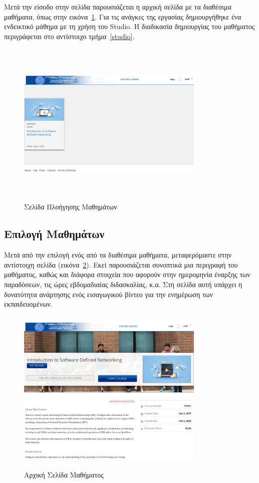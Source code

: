 \documentclass[12pt]{report}
\begin{document}
Μετά την είσοδο στην σελίδα παρουσιάζεται η αρχική σελίδα με τα διαθέσιμα μαθήματα, όπως στην εικόνα~\ref{fig:microsite-explore-course}. Για τις ανάγκες της εργασίας δημιουργήθηκε ένα ενδεικτικό μάθημα με τη χρήση του \textlatin{Studio}. Η διαδικασία δημιουργίας του μαθήματος περιγράφεται στο αντίστοιχο τμήμα~\ref{studio}.
\begin{figure}[h]
\centering
\includegraphics[width=0.8\textwidth, height=8cm]{microsite-explore-courses}
\caption{Σελίδα Πλοήγησης Μαθημάτων}
\label{fig:microsite-explore-course}
\end{figure}

\subsection{Επιλογή Μαθημάτων}
Μετά από την επιλογή ενός από τα διαθέσιμα μαθήματα, μεταφερόμαστε στην αντίστοιχη σελίδα (εικόνα~\ref{fig:microsite-course1}). Εκεί παρουσιάζεται συνοπτικά μια περιγραφή του μαθήματος, καθώς και διάφορα στοιχεία που αφορούν στην ημερομηνία έναρξης των παραδόσεων, τις ώρες εβδομαδιαίας διδασκαλίας, κ.α. Στη σελίδα αυτή υπάρχει η δυνατότητα ανάρτησης ενός εισαγωγικού βίντεο για την ενημέρωση των εκπαιδευομένων.
\begin{figure}[h]
\centering
\includegraphics[width=0.8\textwidth, height=8cm]{microsite-course1}
\caption{Αρχική Σελίδα Μαθήματος}
\label{fig:microsite-course1}
\end{figure}
\end{document}

